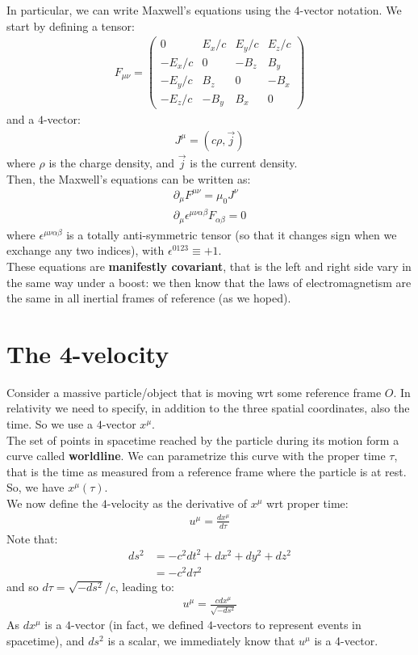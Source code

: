 \documentclass[../template.tex]{subfiles}
\begin{document}
In particular, we can write Maxwell's equations using the $4$-vector notation. We start by defining a tensor:
\begin{align*}
    F_{\mu \nu} = \left(\begin{array}{cccc}
    0 & E_x/c & E_y/c & E_z/c \\ 
    -E_x/c & 0 & -B_z & B_y \\ 
    -E_y/c & B_z & 0 & -B_x \\ 
    -E_z/c & -B_y & B_x & 0
    \end{array}\right)
\end{align*} 
and a $4$-vector:
\begin{align*}
    J^\mu = (c \rho, \vec{j})
\end{align*} 
where $\rho$ is the charge density, and $\vec{j}$ is the current density.\\
Then, the Maxwell's equations can be written as:
\begin{align*}
    \partial_\mu F^{\mu \nu} = \mu_0 J^\nu\\
    \partial_\mu \epsilon^{\mu \nu \alpha \beta}F_{\alpha \beta} = 0
\end{align*}
where $\epsilon^{\mu \nu \alpha \beta}$ is a totally anti-symmetric tensor (so that it changes sign when we exchange any two indices), with $\epsilon^{0123} \equiv +1$. \\
These equations are \textbf{manifestly covariant}, that is the left and right side vary in the same way under a boost: we then know that the laws of electromagnetism are the same in all inertial frames of reference (as we hoped). 

\section{The 4-velocity}
Consider a massive particle/object that is moving wrt some reference frame $O$. In relativity we need to specify, in addition to the three spatial coordinates, also the time. So we use a $4$-vector $x^\mu$.\\
The set of points in spacetime reached by the particle during its motion form a curve called \textbf{worldline}. We can parametrize this curve with the proper time $\tau$, that is the time as measured from a reference frame where the particle is at rest. So, we have $x^\mu(\tau)$.\\

We now define the $4$-velocity as the derivative of $x^\mu$ wrt proper time:
\begin{align*}
    u^\mu = \frac{dx^\mu}{d \tau} 
\end{align*}
Note that:
\begin{align*}
    ds^2 &=  -c^2 dt^2 + dx^2 + dy^2 +dz^2 \\
    &=  -c^2 d \tau^2
\end{align*}
and so $d \tau = \sqrt{-ds^2}/c$, leading to:
\begin{align*}
    u^\mu = \frac{c dx^\mu}{\sqrt{-ds^2}} 
\end{align*}
As $dx^\mu$ is a $4$-vector (in fact, we defined $4$-vectors to represent events in spacetime), and $ds^2$ is a scalar, we immediately know that $u^\mu$ is a 4-vector.\\
\end{document}
